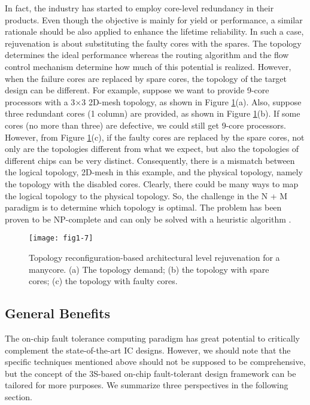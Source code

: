 In fact, the industry has started to employ core-level redundancy in their products. Even though the objective is mainly for yield or performance, a similar rationale should be also applied to enhance the lifetime reliability. In such a case, rejuvenation is about substituting the faulty cores with the spares. The topology determines the ideal performance whereas the routing algorithm and the flow control mechanism determine how much of this potential is realized. However, when the failure cores are replaced by spare cores, the topology of the target design can be different. For example, suppose we want to provide 9-core processors with a 3×3 2D-mesh topology, as shown in Figure \ref{fig:topology-reconfig}(a). Also, suppose three redundant cores (1 column) are provided, as shown in Figure \ref{fig:topology-reconfig}(b). If some cores (no more than three) are defective, we could still get 9-core processors. 
However, from Figure \ref{fig:topology-reconfig}(c), if the faulty cores are replaced by the spare cores, not only are the topologies different from what we expect, but also the topologies of different chips can be very distinct. Consequently, there is a mismatch between the logical topology, 2D-mesh in this example, and the physical topology, namely the topology with the disabled cores. Clearly, there could be many ways to map the logical topology to the physical topology. So, the challenge in the N + M paradigm is to determine which topology is optimal. The problem has been proven to be NP-complete and can only be solved with a heuristic algorithm \cite{zhang2009topology}.

\begin{figure}[t]
\centering
\texttt{[image: fig1-7]}
\caption{Topology reconfiguration-based architectural level rejuvenation for a manycore. (a) The topology demand;
(b) the topology with spare cores; (c) the topology with faulty cores.}
\label{fig:topology-reconfig} 
\end{figure}

\subsection{General Benefits}
The on-chip fault tolerance computing paradigm has great potential to critically complement the state-of-the-art IC designs. However, we should note that the specific techniques mentioned above should not be supposed to be comprehensive, but the concept of the 3S-based on-chip fault-tolerant design framework can be tailored for more purposes. We summarize three perspectives in the following section.

